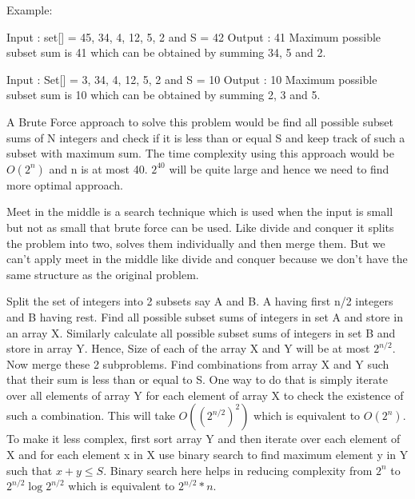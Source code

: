 \documentclass[8pt, a4paper, oneside, twocolumn]{extarticle}
\begin{document}
Example:

Input  : set[] = {45, 34, 4, 12, 5, 2} and S = 42
Output : 41
Maximum possible subset sum is 41 which can be obtained by summing 34, 5 and 2.

Input  : Set[] = {3, 34, 4, 12, 5, 2} and S = 10
Output : 10
Maximum possible subset sum is 10 which can be obtained by summing 2, 3 and 5.

A Brute Force approach to solve this problem would be find all possible subset sums of N integers and check if it is less than or equal S and keep track of such a subset with maximum sum. The time complexity using this approach would be $O(2^n)$ and n is at most 40. $2^{40}$ will be quite large and hence we need to find more optimal approach.

Meet in the middle is a search technique which is used when the input is small but not as small that brute force can be used. Like divide and conquer it splits the problem into two, solves them individually and then merge them. But we can’t apply meet in the middle like divide and conquer because we don’t have the same structure as the original problem.

    Split the set of integers into 2 subsets say A and B. A having first n/2 integers and B having rest.
    Find all possible subset sums of integers in set A and store in an array X. Similarly calculate all possible subset sums of integers in set B and store in array Y. Hence, Size of each of the array X and Y will be at most $2^{n/2}$.
    Now merge these 2 subproblems. Find combinations from array X and Y such that their sum is less than or equal to S.
        One way to do that is simply iterate over all elements of array Y for each element of array X to check the existence of such a combination. This will take $O((2^{n/2})^2)$ which is equivalent to $O(2^n)$.
        To make it less complex, first sort array Y and then iterate over each element of X and for each element x in X use binary search to find maximum element y in Y such that $x + y \leq S$.
        Binary search here helps in reducing complexity from $2^n$ to $2^{n/2} \log{2^{n/2}}$ which is equivalent to $2^{n/2} *n$.
\end{document}
